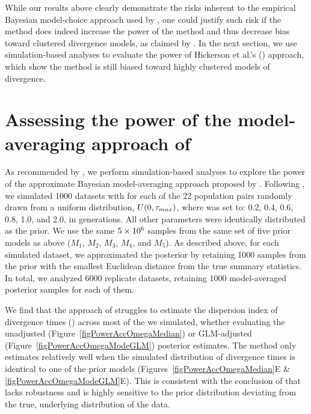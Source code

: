 \documentclass[letterpaper,12pt]{article}
\begin{document}
\begin{linenumbers}
While our results above clearly demonstrate the risks inherent to the empirical
Bayesian model-choice approach used by \citet{Hickerson2013}, one could justify
such risk if the method does indeed increase the power of the method and thus
decrease bias toward clustered divergence models, as claimed by
\citet{Hickerson2013}.
In the next section, we use simulation-based analyses to evaluate the power of
Hickerson et al.'s (\citeyear{Hickerson2013}) approach, which show the method is
still biased toward highly clustered models of divergence.





\section*{Assessing the power of the model-averaging approach of
    \citet{Hickerson2013}}

As recommended by \citet{Oaks2012}, we perform simulation-based analyses
to explore the power of the approximate Bayesian model-averaging approach
proposed by \citet{Hickerson2013}.
Following \citet{Oaks2012}, we simulated 1000 datasets with \divt{} for each of
the 22 population pairs randomly drawn from a uniform distribution, $U(0,
\tau_{max})$, where  was set to: 0.2, 0.4, 0.6, 0.8, 1.0, and 2.0, in
\globalcoalunit generations.
All other parameters were identically distributed as the prior.
We use the same $5\times 10^{6}$ samples from the same set of five prior models as above
($M_1$, $M_2$, $M_3$, $M_4$, and $M_5$).
As described above, for each simulated dataset, we approximated the posterior
by retaining 1000 samples from the prior with the smallest Euclidean distance
from the true summary statistics.
In total, we analyzed 6000 replicate datasets, retaining 1000 model-averaged
posterior samples for each of them.

We find that the approach of \citet{Hickerson2013} struggles to estimate the
dispersion index of divergence times (\vmratio{}) across most of the 
we simulated, whether evaluating the unadjusted
(Figure~\ref{figPowerAccOmegaMedian}) or GLM-adjusted
(Figure~\ref{figPowerAccOmegaModeGLM}) posterior estimates.
The method only estimates \vmratio{} relatively well when the simulated
distribution of divergence times is identical to one of the prior models
(Figures~\ref{figPowerAccOmegaMedian}E \& \ref{figPowerAccOmegaModeGLM}E).
This is consistent with the conclusion of \citet{Oaks2012} that \msb lacks
robustness and is highly sensitive to the prior distribution deviating from the
true, underlying distribution of the data.


\end{linenumbers}
\end{document}

